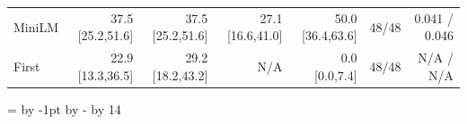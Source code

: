 \begin{table}[!htbp]
{\begin{tabular}{lrrrrrr}
MiniLM & 37.5 \textcolor{black!60}{[25.2,51.6]} & 37.5 \textcolor{black!60}{[25.2,51.6]} & 27.1 \textcolor{black!60}{[16.6,41.0]} & 50.0 \textcolor{black!60}{[36.4,63.6]} & 48/48 & 0.041 / 0.046 \\
First & 22.9 \textcolor{black!60}{[13.3,36.5]} & 29.2 \textcolor{black!60}{[18.2,43.2]} & N/A & 0.0 \textcolor{black!60}{[0.0,7.4]} & 48/48 & N/A / N/A \\
\bottomrule
\end{tabular}}
\setlength{\tabcolsep}{0pt}
=\linewidth\advance{} by -1pt\advance{} by -\divide{} by 14
\ifdim\dimen0<1.5pt \dimen0=1.5pt\fi
\setlength{\tabcolsep}{\dimen0}\familytab
\end{table}
